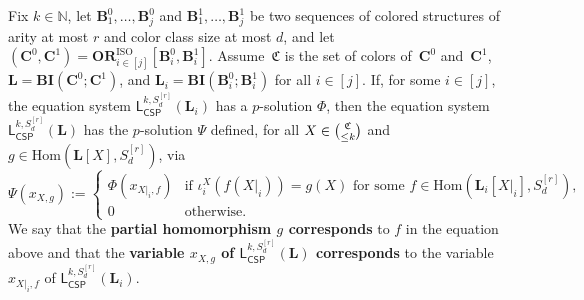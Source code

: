 \documentclass[a4paper,english, thm-restate]{lipics-v2021}
\newcommand{\nat}{\mathbb{N}}
\newcommand{\defining}[1]{\textbf{#1}}
\newcommand{\StructB}{\mathbf{B}}
\newcommand{\StructC}{\mathbf{C}}
\newcommand{\StructL}{\mathbf{L}}
\newcommand{\restrict}[2]{#1|_{#2}}
\newcommand{\Hom}[2]{\mathrm{Hom}(#1,#2)}
\newcommand{\leqs}{\mathsf{L}}
\newcommand{\cspiso}[3]{\leqs^{#1,#2}_{\mathsf{CSP}}(#3)}
\newcommand{\bcisosys}[2]{\mathbf{BI}(#1;#2)}
\newcommand{\colors}{\mathfrak{C}}
\newcommand{\CosetGrpTmplt}[2]{#1^{[#2]}}
\newcommand{\Sym}[1]{S_{#1}}
\newcommand{\SymStruct}[2]{\CosetGrpTmplt{\Sym{#1}}{#2}}
\newcommand{\ORISO}[2]{\mathbf{OR}^{\text{ISO}}_{#1}[#2]}
\begin{document}
	\begin{lemma}
		\label{lem:or-construction-p-solution}
		Fix $k \in \nat$, let $\StructB_1^0, \dots, \StructB_j^0$ and $\StructB_1^1,\dots, \StructB_j^1$
		be two sequences of colored structures of arity at most $r$ and color class size at most $d$,
		and let $(\StructC^0, \StructC^1) = \ORISO{i\in [j]} {\StructB_i^0,\StructB_i^1}$.
		Assume~$\colors$ is the set of colors of~$\StructC^0$ and~$\StructC^1$,
		$\StructL = \bcisosys{\StructC^0}{\StructC^1}$, and
		$\StructL_i = \bcisosys{\StructB_i^0}{\StructB_i^1}$ for all $i \in [j]$.
		If, for some $i \in [j]$, 
the equation system $\cspiso{k}{\SymStruct{d}{r}}{\StructL_i}$
		has a $p$-solution $\Phi$,
		then the equation system 
		$\cspiso{k}{\SymStruct{d}{r}}{\StructL}$
		has the  $p$-solution $\Psi$
		defined, for all $X \in \tbinom{\colors}{\leq k}$ and $g \in \Hom{\StructL[X]}{\SymStruct{d}{r}}$,
		via
		\[
		\Psi(x_{X,g}) :=  \begin{cases}
			\Phi(x_{\restrict{X}{i},f}) & \text{if } \iota_i^X(f(X|_i)) = g(X) \text{ for some } f \in \Hom{\StructL_i[\restrict{X}{i}]}{\SymStruct{d}{r}},\\
			0 & \text{otherwise.}
		\end{cases}
		\]
		We say that the \defining{partial homomorphism $g$
			corresponds} to $f$ in the equation above
		and that the \defining{variable $x_{X,g}$ of $\cspiso{k}{\SymStruct{d}{r}}{\StructL}$
			corresponds} to the variable $x_{\restrict{X}{i},f}$
		of $\cspiso{k}{\SymStruct{d}{r}}{\StructL_i}$.
	\end{lemma}
\end{document}
